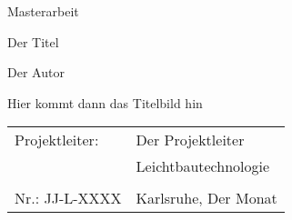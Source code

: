 \documentclass[12pt,a4paper,twoside]{book}
\author{\Author}
\title{\Title}
\newcommand{\Author}{Der Autor}
\newcommand{\Title}{Der Titel}
\begin{document}
	\frontmatter
	\tikzexternaldisable

	\pagestyle{titelblatt}
	\vspace*{4cm}
	\begin{center}
		{\huge Masterarbeit}
		\vspace{2cm}

		{\Large \Title}
		\vspace{2cm}

		{\large \Author}
		\vspace{2cm}

		Hier kommt dann das Titelbild hin

		\vspace{6.5cm}

	\end{center}
		\begin{tabularx}{\textwidth}{lX}
		Projektleiter: & Der Projektleiter \\ & Leichtbautechnologie \\
		& \\
		Nr.: JJ-L-XXXX & \multicolumn{1}{r}{Karlsruhe, Der Monat \the\year} \\
		\end{tabularx}
\end{document}
